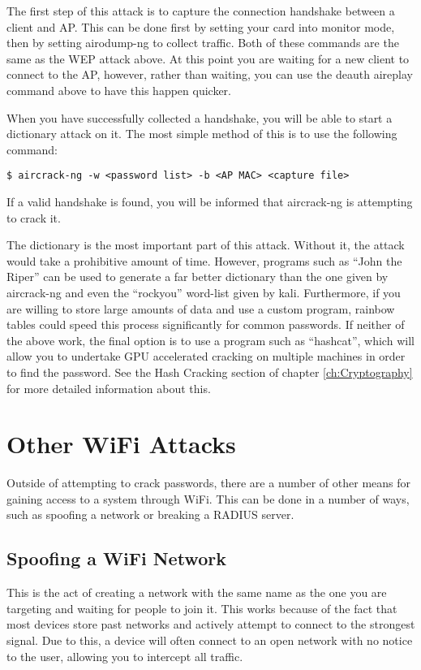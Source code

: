 			The first step of this attack is to capture the connection handshake between a client and AP. 
			This can be done first by setting your card into monitor mode, then by setting airodump-ng to collect traffic. 
			Both of these commands are the same as the WEP attack above. 
			At this point you are waiting for a new client to connect to the AP, however, rather than waiting, you can use the deauth aireplay command above to have this happen quicker. 

			When you have successfully collected a handshake, you will be able to start a dictionary attack on it. 
			The most simple method of this is to use the following command:
			\begin{lstlisting}[style=CLI]
				$ aircrack-ng -w <password list> -b <AP MAC> <capture file>
			\end{lstlisting}
			If a valid handshake is found, you will be informed that aircrack-ng is attempting to crack it. 

			The dictionary is the most important part of this attack. 
			Without it, the attack would take a prohibitive amount of time. 
			However, programs such as ``John the Riper'' can be used to generate a far better dictionary than the one given by aircrack-ng and even the ``rockyou'' word-list given by kali. 
			Furthermore, if you are willing to store large amounts of data and use a custom program, rainbow tables could speed this process significantly for common passwords. 
			If neither of the above work, the final option is to use a program such as ``hashcat'', which will allow you to undertake GPU accelerated cracking on multiple machines in order to find the password. 
			See the Hash Cracking section of chapter \ref{ch:Cryptography} for more detailed information about this. 
	\section{Other WiFi Attacks}
		Outside of attempting to crack passwords, there are a number of other means for gaining access to a system through WiFi. 
		This can be done in a number of ways, such as spoofing a network or breaking a RADIUS server. 
		\subsection{Spoofing a WiFi Network}
			This is the act of creating a network with the same name as the one you are targeting and waiting for people to join it. 
			This works because of the fact that most devices store past networks and actively attempt to connect to the strongest signal. 
			Due to this, a device will often connect to an open network with no notice to the user, allowing you to intercept all traffic. 

